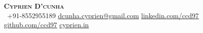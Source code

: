 \begin{center}
    \textbf{\Huge \scshape Cyprien D'cunha} \\ \vspace{8pt}
     \ \small +91-8552955189 \quad
    \href{mailto:dcunha.cyprien@gmail.com}{ \underline{dcunha.cyprien@gmail.com}} \quad
    \href{https://www.linkedin.com/in/ccd97/}{ \underline{linkedin.com/ccd97}} \quad
    \href{https://github.com/ccd97}{ \underline{github.com/ccd97}} \quad
    \href{https://cyprien.in/}{ \underline{cyprien.in}}
\end{center}